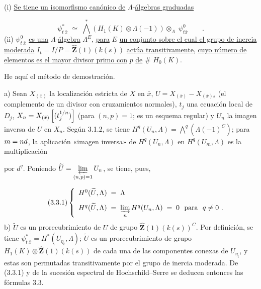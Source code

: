 (i) \underline{Se tiene un isomorfismo canónico de} $\Lambda$-\underline{álgebras graduadas}

\begin{equation*}
\psi^{*}_{t\ \bar{x}} \;\simeq\; \overset{*}{\bigwedge}(H_{1}(K) \otimes \Lambda(-1)) \otimes_{\Lambda} \; \psi^{0}_{t\bar{x}} \qquad .
\end{equation*}
(ii) $\psi^{0}_{t\ \bar{x}}$ \underline{es una} $\Lambda$-\underline{álgebra} $\Lambda^{E}$, \underline{para} $E$ \underline{un conjunto sobre el cual el grupo de inercia moderada} $I_{t} = I/P = \hat{\mathbf{Z}}(1)(k(s))$ \underline{actúa transitivamente}, \underline{cuyo número de elementos es el mayor divisor primo con} $p$ \underline{de} $\#$ $H_{0}(K)$.

He aquí el método de demostración.

a) Sean $X_{(\bar{x})}$ la localización estricta de $X$ en $\bar{x}$, $U = X_{(\bar{x})} - X_{(\bar{x})s}$ (el complemento de un divisor con cruzamientos normales), $t_{j}$ una ecuación local de $D_{j}$, $X_{n} = \sisi{X_{(x)}}{X_{(\bar{x})}}\left[(t_{j}^{1/n})\right]$ (para $(n,p) = 1$; es un esquema regular) y $U_{n}$ la imagen inversa de $U$ en $X_{n}$. Según 3.1.2, se tiene $H^{q}(U_{n},\Lambda) = \overset{q}{\bigwedge}(\Lambda(-1)^{C})$; para $m = \sisi{x d}{n d}$, la aplicación «imagen inversa» de $H^{q}(U_{n},\Lambda)$ en $H^{q}(U_{m},\Lambda)$ es la multiplicación



por $d^{q}$. Poniendo $\widetilde{U} = \varprojlim\limits_{(n,p)=1} U_{n}$, se tiene, pues,

\begin{equation}\tag{3.3.1}
\left\{\begin{array}{l} H^{0}(\widetilde{U},\Lambda) \;=\; \Lambda \\[8pt] H^{q}(\widetilde{U},\Lambda) \;=\; \varinjlim\limits_{n} H^{q}(U_{n},\Lambda) \;=\; 0 \ \ \text{para}\ \ q \neq 0 \ . \end{array}\right.
\end{equation}
b) $\widetilde{U}$ es un prorecubrimiento de $U$ de grupo $\hat{\mathbf{Z}}(1)(k(s))^{C}$. Por definición, se tiene $\psi^{*}_{t\ \bar{x}} = H^{*}(U_{\eta_{t}} ,\Lambda)$; $\widetilde{U}$ es un prorecubrimiento de grupo $H_{1}(K) \otimes \hat{\mathbf{Z}}(1)(k(s))$ de cada una de las componentes conexas de $U_{\eta_{t}}$, y estas son permutadas transitivamente por el grupo de inercia moderada. De (3.3.1) y de la sucesión espectral de Hochschild--Serre se deducen entonces las fórmulas 3.3.

